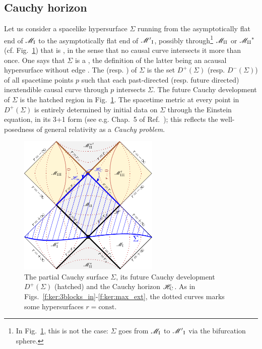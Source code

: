 \subsection{Cauchy horizon} \label{s:ker:Cauchy_hor}

Let us consider a spacelike hypersurface $\Sigma$ running from the asymptotically
flat end of $\mathscr{M}_{\rm I}$ to the asymptotically flat end of ${\mathscr{M}'}_{\rm I}$,
possibly through\footnote{In Fig.~\ref{f:ker:cauchy_hor},
this is not the case: $\Sigma$ goes from $\mathscr{M}_{\rm I}$ to
 ${\mathscr{M}'}_{\rm I}$ via the bifurcation sphere.} $\mathscr{M}_{\rm II}$ or ${\mathscr{M}_{\rm II}}^*$ (cf. Fig.~\ref{f:ker:cauchy_hor})
that is , in the
sense that no causal curve intersects it more than once. One says that $\Sigma$ is
a , the definition of the latter being
an acausal hypersurface without edge \cite{HawkiE73}.
The 
(resp. ) of
$\Sigma$ is the set $D^+(\Sigma)$ (resp. $D^-(\Sigma)$)
of all spacetime points $p$ such that each past-directed (resp. future directed) inextendible causal curve
through $p$ intersects $\Sigma$. The future Cauchy development of $\Sigma$ is
the hatched region in Fig.~\ref{f:ker:cauchy_hor}.
The spacetime metric at every point in $D^+(\Sigma)$ is entirely determined
by initial data on $\Sigma$ through the Einstein equation, in its 3+1 form
(see e.g. Chap.~5 of Ref.~\cite{Gourg12}); this reflects the well-posedness
of general relativity as a \emph{Cauchy problem}.

\begin{figure}
\centerline{\includegraphics[width=0.6\textwidth]{ker_cauchy_hor.png}}
\caption[]{\label{f:ker:cauchy_hor} \footnotesize
The partial Cauchy surface $\Sigma$, its future Cauchy development $D^+(\Sigma)$ (hatched)
and the Cauchy horizon $\mathscr{H}_{\rm C}$.
As in Figs.~\ref{f:ker:3blocks_in}-\ref{f:ker:max_ext},
the dotted curves marks some hypersurfaces $r=\mathrm{const}$.}
\end{figure}



